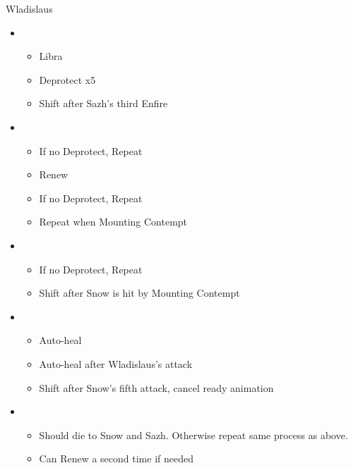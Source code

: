 	\begin{battle}[0:45]{Wladislaus}
		\begin{itemize}
			\item \third
			      \begin{itemize}
				      \item Libra
				      \item Deprotect x5
				      \item Shift after Sazh's third Enfire
			      \end{itemize}
			\item \second
			      \begin{itemize}
				      \item If no Deprotect, Repeat
				      \item Renew
					  \item If no Deprotect, Repeat
				      \item Repeat when Mounting Contempt
			      \end{itemize}
			\item \third
			      \begin{itemize}
				      \item If no Deprotect, Repeat
				      \item Shift after Snow is hit by Mounting Contempt
			      \end{itemize}
			\item \fourth
			      \begin{itemize}
				      \item Auto-heal
				      \item Auto-heal after Wladislaus's attack
				      \item Shift after Snow's fifth attack, cancel ready animation
			      \end{itemize}
			\item \second
			      \begin{itemize}
				      \item Should die to Snow and Sazh. Otherwise repeat same process as above.
				      \item Can Renew a second time if needed
			      \end{itemize}
		\end{itemize}
	\end{battle}
	
